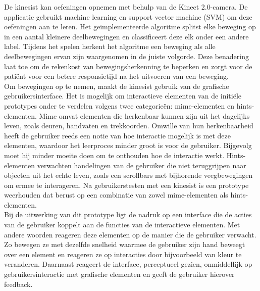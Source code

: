 De kinesist kan oefeningen opnemen met behulp van de Kinect 2.0-camera. De applicatie gebruikt machine learning en support vector machine (SVM) om deze oefeningen aan te leren. Het ge\"implementeerde algoritme splitst elke beweging op in een aantal kleinere deelbewegingen en classificeert deze elk onder een andere label. Tijdens het spelen herkent het algoritme een beweging als alle deelbewegingen ervan zijn waargenomen in de juiste volgorde. Deze benadering laat toe om de rekenkost van bewegingsherkenning te beperken en zorgt voor de pati\"ent voor een betere responsietijd na het uitvoeren van een beweging.\\

Om bewegingen op te nemen, maakt de kinesist gebruik van de grafische gebruikersinterface. Het is mogelijk om interactieve elementen van de initi\"ele prototypes onder te verdelen volgens twee categorie\"en: mime-elementen en hints-elementen. Mime omvat elementen die herkenbaar kunnen zijn uit het dagelijks leven, zoals deuren, handvaten en trekkoorden. Omwille van hun herkenbaarheid heeft de gebruiker reeds een notie van hoe interactie mogelijk is met deze elementen, waardoor het leerproces minder groot is voor de gebruiker. Bijgevolg moet hij minder moeite doen om te onthouden hoe de interactie werkt. Hints-elementen verwachten handelingen van de gebruiker die niet teruggrijpen naar objecten uit het echte leven, zoals een scrollbars met bijhorende veegbewegingen om ermee te interageren. Na gebruikerstesten met een kinesist is een prototype weerhouden dat berust op een combinatie van zowel mime-elementen als hints-elementen.\\

Bij de uitwerking van dit prototype ligt de nadruk op een interface die de acties van de gebruiker koppelt aan de functies van de interactieve elementen. Met andere woorden reageren deze elementen op de manier die de gebruiker verwacht. Zo bewegen ze met dezelfde snelheid waarmee de gebruiker zijn hand beweegt over een element en reageren ze op interacties door bijvoorbeeld van kleur te veranderen. Daarnaast reageert de interface, perceptueel gezien, onmiddellijk op gebruikersinteractie met grafische elementen en geeft de gebruiker hierover feedback.\\

